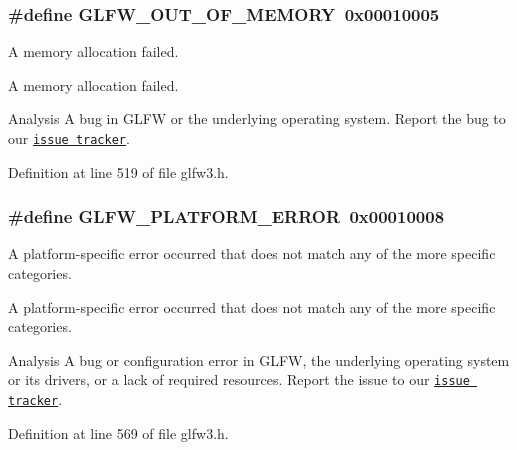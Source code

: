 \subsubsection[{G\+L\+F\+W\+\_\+\+O\+U\+T\+\_\+\+O\+F\+\_\+\+M\+E\+M\+O\+R\+Y}]{\setlength{\rightskip}{0pt plus 5cm}\#define G\+L\+F\+W\+\_\+\+O\+U\+T\+\_\+\+O\+F\+\_\+\+M\+E\+M\+O\+R\+Y~0x00010005}\label{group__errors_ga9023953a2bcb98c2906afd071d21ee7f}


A memory allocation failed. 

A memory allocation failed.

\begin{DoxyParagraph}{Analysis}
A bug in G\+L\+F\+W or the underlying operating system. Report the bug to our \href{https://github.com/glfw/glfw/issues}{\tt issue tracker}. 
\end{DoxyParagraph}


Definition at line 519 of file glfw3.\+h.

\hypertarget{group__errors_gad44162d78100ea5e87cdd38426b8c7a1}{}
\subsubsection[{G\+L\+F\+W\+\_\+\+P\+L\+A\+T\+F\+O\+R\+M\+\_\+\+E\+R\+R\+O\+R}]{\setlength{\rightskip}{0pt plus 5cm}\#define G\+L\+F\+W\+\_\+\+P\+L\+A\+T\+F\+O\+R\+M\+\_\+\+E\+R\+R\+O\+R~0x00010008}\label{group__errors_gad44162d78100ea5e87cdd38426b8c7a1}


A platform-\/specific error occurred that does not match any of the more specific categories. 

A platform-\/specific error occurred that does not match any of the more specific categories.

\begin{DoxyParagraph}{Analysis}
A bug or configuration error in G\+L\+F\+W, the underlying operating system or its drivers, or a lack of required resources. Report the issue to our \href{https://github.com/glfw/glfw/issues}{\tt issue tracker}. 
\end{DoxyParagraph}


Definition at line 569 of file glfw3.\+h.

\hypertarget{group__errors_gad16c5565b4a69f9c2a9ac2c0dbc89462}{}
